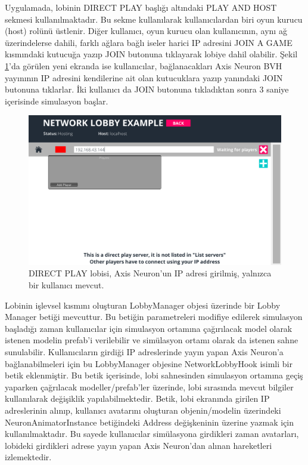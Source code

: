 \documentclass[a4paper, 12pt, titlepage]{article}
\begin{document}
Uygulamada, lobinin DIRECT PLAY başlığı altındaki PLAY AND HOST sekmesi kullanılmaktadır. Bu sekme
kullanılarak kullanıcılardan biri oyun kurucu (host) rolünü üstlenir. Diğer kullanıcı, oyun kurucu
olan kullanıcının, aynı ağ üzerindelerse dahili, farklı ağlara bağlı iseler harici IP adresini JOIN
A GAME kısmındaki kutucuğa yazıp JOIN butonuna tıklayarak lobiye dahil olabilir. Şekil \ref{l1}’da
görülen yeni ekranda ise kullanıcılar, bağlanacakları Axis Neuron BVH yayınının IP adresini
kendilerine ait olan kutucuklara yazıp yanındaki JOIN butonuna tıklarlar. İki kullanıcı da JOIN
butonuna tıkladıktan sonra 3 saniye içerisinde simulasyon başlar.

\begin{figure}[hbt!]
    \centering
        \includegraphics[width=6in]{images/l1}
    \caption{DIRECT PLAY lobisi, Axis Neuron'un IP adresi girilmiş, yalnızca bir kullanıcı mevcut.}
    \label{l1}
\end{figure}

Lobinin işlevsel kısmını oluşturan LobbyManager objesi üzerinde bir Lobby Manager betiği mevcuttur.
Bu betiğin parametreleri modifiye edilerek simulasyon başladığı zaman kullanıcılar için simulasyon
ortamına çağırılacak model olarak istenen modelin prefab’i verilebilir ve simülasyon ortamı olarak
da istenen sahne sunulabilir. Kullanıcıların girdiği IP adreslerinde yayın yapan Axis Neuron’a
bağlanabilmeleri için bu LobbyManager objesine NetworkLobbyHook isimli bir betik eklenmiştir. Bu
betik içerisinde, lobi sahnesinden simulasyon ortamına geçiş yaparken çağrılacak modeller/prefab’ler
üzerinde, lobi sırasında mevcut bilgiler kullanılarak değişiklik yapılabilmektedir. Betik, lobi
ekranında girilen IP adreslerinin alınıp, kullanıcı avatarını oluşturan objenin/modelin üzerindeki
NeuronAnimatorInstance betiğindeki Address değişkeninin üzerine yazmak için kullanılmaktadır. Bu
sayede kullanıcılar simülasyona girdikleri zaman avatarları, lobideki girdikleri adrese yayın yapan
Axis Neuron’dan alınan hareketleri izlemektedir.
\end{document}
